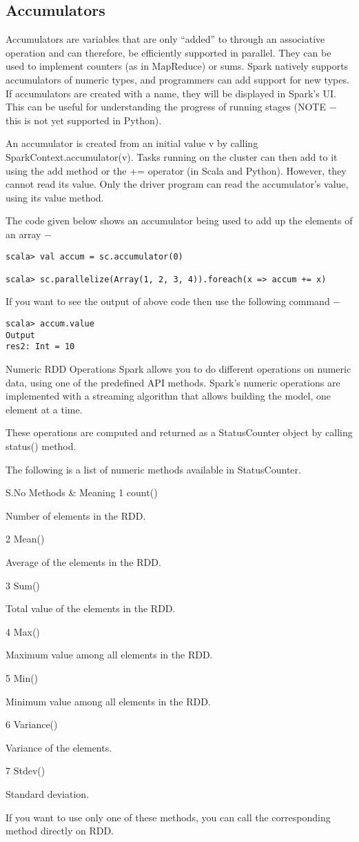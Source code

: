 \documentclass[a4paper,12pt]{article}
\begin{document}
\subsection*{Accumulators}
Accumulators are variables that are only “added” to through an associative operation and can therefore, be efficiently supported in parallel. They can be used to implement counters (as in MapReduce) or sums. Spark natively supports accumulators of numeric types, and programmers can add support for new types. If accumulators are created with a name, they will be displayed in Spark’s UI. This can be useful for understanding the progress of running stages (NOTE − this is not yet supported in Python).

An accumulator is created from an initial value v by calling SparkContext.accumulator(v). Tasks running on the cluster can then add to it using the add method or the += operator (in Scala and Python). However, they cannot read its value. Only the driver program can read the accumulator’s value, using its value method.

The code given below shows an accumulator being used to add up the elements of an array −
\begin{verbatim}
scala> val accum = sc.accumulator(0) 
 
scala> sc.parallelize(Array(1, 2, 3, 4)).foreach(x => accum += x)
\end{verbatim}
If you want to see the output of above code then use the following command −
\begin{verbatim}
scala> accum.value 
Output
res2: Int = 10 
\end{verbatim}
Numeric RDD Operations
Spark allows you to do different operations on numeric data, using one of the predefined API methods. Spark’s numeric operations are implemented with a streaming algorithm that allows building the model, one element at a time.

These operations are computed and returned as a StatusCounter object by calling status() method.

The following is a list of numeric methods available in StatusCounter.

S.No	Methods & Meaning
1	
count()

Number of elements in the RDD.

2	
Mean()

Average of the elements in the RDD.

3	
Sum()

Total value of the elements in the RDD.

4	
Max()

Maximum value among all elements in the RDD.

5	
Min()

Minimum value among all elements in the RDD.

6	
Variance()

Variance of the elements.

7	
Stdev()

Standard deviation.

If you want to use only one of these methods, you can call the corresponding method directly on RDD.
\end{document}
